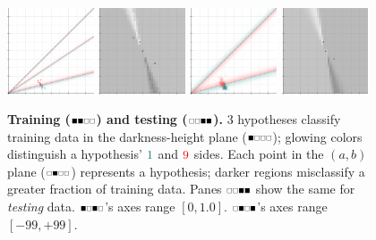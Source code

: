 \documentclass[11pt, justified]{tufte-book}
\newcommand{\offourline}[1]{
    {\tiny \raisebox{0.04cm}{\scalebox{0.9}{$\substack{
        \IfSubStr{#1}{0}{{\blacksquare}}{\square}   
        \IfSubStr{#1}{1}{{\blacksquare}}{\square}
        \IfSubStr{#1}{2}{{\blacksquare}}{\square}   
        \IfSubStr{#1}{3}{{\blacksquare}}{\square}   
    }$}}}%
}
\theoremstyle{definition}
\begin{document}
        \begin{figure}[h]
            \centering
            \includegraphics[width=0.23\textwidth]{example-mnist/new-train.png}%
            \hspace{0.01\textwidth}%
            \includegraphics[width=0.23\textwidth]{example-mnist/new-train-scat.png}%
            \hspace{0.02\textwidth}%
            \includegraphics[width=0.23\textwidth]{example-mnist/new-test.png}%
            \hspace{0.01\textwidth}%
            \includegraphics[width=0.23\textwidth]{example-mnist/new-test-scat.png}
            \caption{
              \textbf{Training
              ($\protect\offourline{01}$) and testing
              ($\protect\offourline{23}$).}
              $3$ hypotheses classify training data in the darkness-height
              plane ($\protect\offourline{0}$); glowing colors distinguish a
              hypothesis' $\cya{1}$ and $\red{9}$ sides.
              Each point in the $(a,b)$ plane ($\protect\offourline{1}$)
              represents a hypothesis; darker regions misclassify a greater
              fraction of training data.
              Panes $\protect\offourline{23}$ show the same for
              \emph{testing} data.
              $\protect\offourline{02}$'s axes range $[0, 1.0]$.
              $\protect\offourline{13}$'s axes range $[-99,+99]$. 
            }
            \label{fig:train-test-digits}
        \end{figure}
\end{document}
